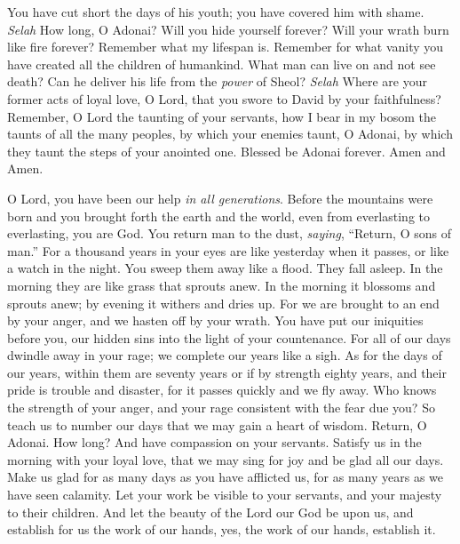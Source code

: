 \begin{biblechapter}
\verse You have cut short the days of his youth; 
you have covered him with shame. \textit{Selah}
\verse How long, O Adonai? Will you hide yourself forever? 
Will your wrath burn like fire forever?
\verse Remember what my lifespan is. 
Remember for what vanity 
you have created all the children of humankind.
\verse What man can live on and not see death? 
Can he deliver his life from the \textit{power} of Sheol? \textit{Selah}
\verse Where are your former acts of loyal love, O Lord, 
that you swore to David by your faithfulness?
\verse Remember, O Lord the taunting of your servants, 
how I bear in my bosom the taunts of all the many peoples,
\verse by which your enemies taunt, O Adonai, 
by which they taunt the steps of your anointed one.
\verse Blessed be Adonai forever. 
Amen and Amen.
\end{biblechapter}

\begin{biblechapter} %
 O Lord, you have been our help \textit{in all generations}.
\verse Before the mountains were born 
and you brought forth the earth and the world, 
even from everlasting to everlasting, you are God.
\verse You return man to the dust, 
\textit{saying}, “Return, O sons of man.”
\verse For a thousand years in your eyes 
are like yesterday when it passes, 
or like a watch in the night.
\verse You sweep them away like a flood. 
They fall asleep. 
In the morning they are like grass that sprouts anew.
\verse In the morning it blossoms and sprouts anew; 
by evening it withers and dries up.
\verse For we are brought to an end by your anger, 
and we hasten off by your wrath.
\verse You have put our iniquities before you, 
our hidden sins into the light of your countenance.
\verse For all of our days dwindle away in your rage; 
we complete our years like a sigh.
\verse As for the days of our years, within them are seventy years 
or if by strength eighty years, and their pride is trouble and disaster, 
for it passes quickly and we fly away.
\verse Who knows the strength of your anger, 
and your rage consistent with the fear due you?
\verse So teach us to number our days 
that we may gain a heart of wisdom.
\verse Return, O Adonai. How long? 
And have compassion on your servants.
\verse Satisfy us in the morning with your loyal love, 
that we may sing for joy and be glad all our days.
\verse Make us glad for as many days as you have afflicted us, 
for as many years as we have seen calamity.
\verse Let your work be visible to your servants, 
and your majesty to their children.
\verse And let the beauty of the Lord our God be upon us, 
and establish for us the work of our hands, 
yes, the work of our hands, establish it.
\end{biblechapter}

